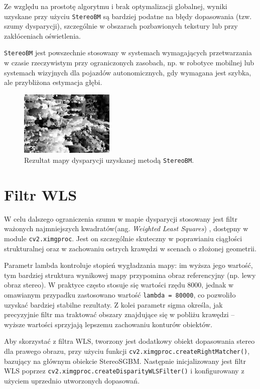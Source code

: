 \documentclass[magisterska]{pracadypl}
\begin{document}
Ze względu na prostotę algorytmu i brak optymalizacji globalnej, wyniki uzyskane przy użyciu \texttt{StereoBM} są bardziej podatne na błędy dopasowania (tzw. szumy dysparycji), szczególnie w obszarach pozbawionych tekstury lub przy zakłóceniach oświetlenia.

\texttt{StereoBM} jest powszechnie stosowany w systemach wymagających przetwarzania w czasie rzeczywistym przy ograniczonych zasobach, np. w robotyce mobilnej lub systemach wizyjnych dla pojazdów autonomicznych, gdy wymagana jest szybka, ale przybliżona estymacja głębi.

\begin{figure}[H]
    \centering
    \includegraphics[width=0.4\textwidth]{images/BMdisparity.png}
    \captionsetup{font=footnotesize}
    \caption[Rezultat mapy dysparycji StereoBM. Opracowanie własne.]{Rezultat mapy dysparycji uzyskanej metodą \texttt{StereoBM}.}
\end{figure}
\section{Filtr WLS}

W celu dalszego ograniczenia szumu w mapie dysparycji stosowany jest filtr ważonych najmniejszych kwadratów(ang. \textit{Weighted Least Squares}) \cite{wls}, dostępny w module \texttt{cv2.ximgproc}. Jest on szczególnie skuteczny w poprawianiu ciągłości strukturalnej oraz w zachowaniu ostrych krawędzi w scenach o złożonej geometrii.

Parametr lambda kontroluje stopień wygładzania mapy: im wyższa jego wartość, tym bardziej struktura wynikowej mapy przypomina obraz referencyjny (np. lewy obraz stereo). W praktyce często stosuje się wartości rzędu 8000, jednak w omawianym przypadku zastosowano wartość \texttt{lambda = 80000}, co pozwoliło uzyskać bardziej stabilne rezultaty. Z kolei parametr sigma określa, jak precyzyjnie filtr ma traktować obszary znajdujące się w pobliżu krawędzi – wyższe wartości sprzyjają lepszemu zachowaniu konturów obiektów.

Aby skorzystać z filtra WLS, tworzony jest dodatkowy obiekt dopasowania stereo dla prawego obrazu, przy użyciu funkcji \texttt{cv2.ximgproc.createRightMatcher()}, bazujący na głównym obiekcie StereoSGBM. Następnie inicjalizowany jest filtr WLS poprzez \texttt{cv2.ximgproc.\allowbreak createDisparityWLSFilter()} i konfigurowany z użyciem uprzednio utworzonych dopasowań.
\end{document}
